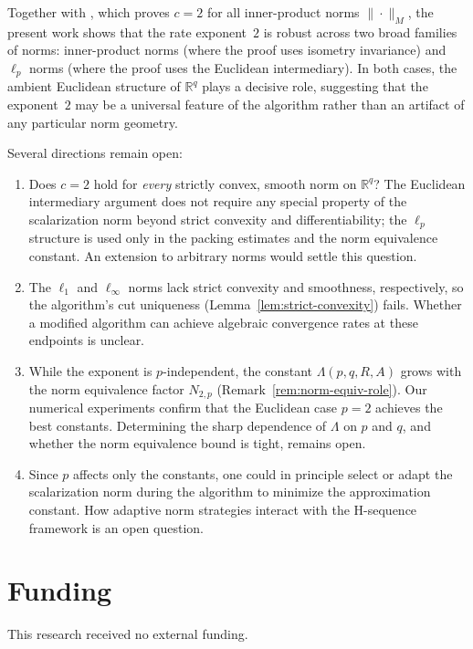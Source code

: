\documentclass[11pt]{article}
\newcommand{\R}{\mathbb{R}}
\begin{document}
Together with \cite{Alshahrani2026}, which proves $c = 2$ for all inner-product norms $\|\cdot\|_M$, the present work shows that the rate exponent~$2$ is robust across two broad families of norms: inner-product norms (where the proof uses isometry invariance) and $\ell_p$ norms (where the proof uses the Euclidean intermediary). In both cases, the ambient Euclidean structure of $\R^q$ plays a decisive role, suggesting that the exponent~$2$ may be a universal feature of the algorithm rather than an artifact of any particular norm geometry.

Several directions remain open:
\begin{enumerate}[label=(\roman*)]
\item Does $c = 2$ hold for \emph{every} strictly convex, smooth norm on $\R^q$? The Euclidean intermediary argument does not require any special property of the scalarization norm beyond strict convexity and differentiability; the $\ell_p$ structure is used only in the packing estimates and the norm equivalence constant. An extension to arbitrary norms would settle this question.

\item The $\ell_1$ and $\ell_\infty$ norms lack strict convexity and smoothness, respectively, so the algorithm's cut uniqueness (Lemma~\ref{lem:strict-convexity}) fails. Whether a modified algorithm can achieve algebraic convergence rates at these endpoints is unclear.

\item While the exponent is $p$-independent, the constant $\Lambda(p,q,R,A)$ grows with the norm equivalence factor $N_{2,p}$ (Remark~\ref{rem:norm-equiv-role}). Our numerical experiments confirm that the Euclidean case $p = 2$ achieves the best constants. Determining the sharp dependence of $\Lambda$ on $p$ and $q$, and whether the norm equivalence bound is tight, remains open.

\item Since $p$ affects only the constants, one could in principle select or adapt the scalarization norm during the algorithm to minimize the approximation constant. How adaptive norm strategies interact with the H-sequence framework is an open question.
\end{enumerate}

\section*{Funding}
This research received no external funding.
\end{document}
